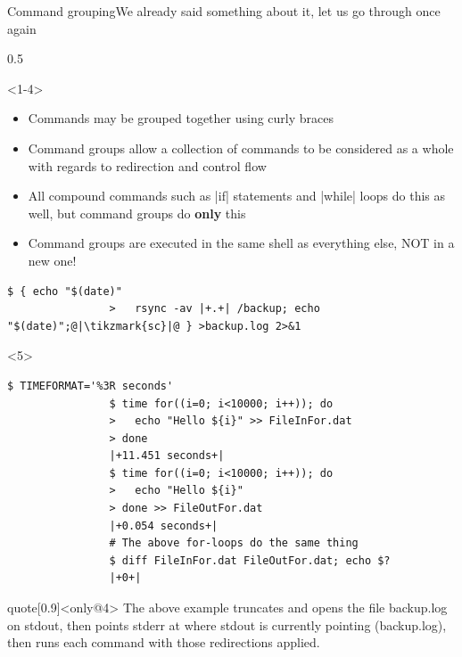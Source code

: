 \begin{frame}[fragile]{Command grouping}{We already said something about it, let us go through once again}
    \begin{overlayarea}{\textwidth}{0.5\textheight}
        \begin{onlyenv}<1-4>
            \begin{itemize}
                \item Commands may be grouped together using curly braces \PB{\texttt{\{\ldots\}}}
                \item Command groups allow a collection of commands to be considered as a whole with regards to redirection and control flow
                \item All compound commands such as \bash|if| statements and \bash|while| loops do this as well, but command groups do \textbf{only} this
                \item Command groups are executed in the same shell as everything else, NOT in a new one!
            \end{itemize}
            \begin{lstlisting}[style=MyBash, numbers=none, aboveskip=2mm]
                $ { echo "$(date)"
                >   rsync -av |+.+| /backup; echo "$(date)";@|\tikzmark{sc}|@ } >backup.log 2>&1
            \end{lstlisting}
        \end{onlyenv}
        \begin{onlyenv}<5>
            \begin{lstlisting}[style=myBash, aboveskip=3mm]
                $ TIMEFORMAT='%3R seconds'
                $ time for((i=0; i<10000; i++)); do
                >   echo "Hello ${i}" >> FileInFor.dat
                > done
                |+11.451 seconds+|
                $ time for((i=0; i<10000; i++)); do
                >   echo "Hello ${i}"
                > done >> FileOutFor.dat
                |+0.054 seconds+|
                # The above for-loops do the same thing
                $ diff FileInFor.dat FileOutFor.dat; echo $?
                |+0+|
            \end{lstlisting}
        \end{onlyenv}
    \end{overlayarea}
    \vspace{-1mm}
    \begin{varblock}{quote}[0.9\textwidth]{}<only@4>
        The above example truncates and opens the file backup.log on stdout, then points stderr at where stdout is currently pointing (backup.log), then runs each command with those redirections applied.

\end{varblock}
\end{frame}
